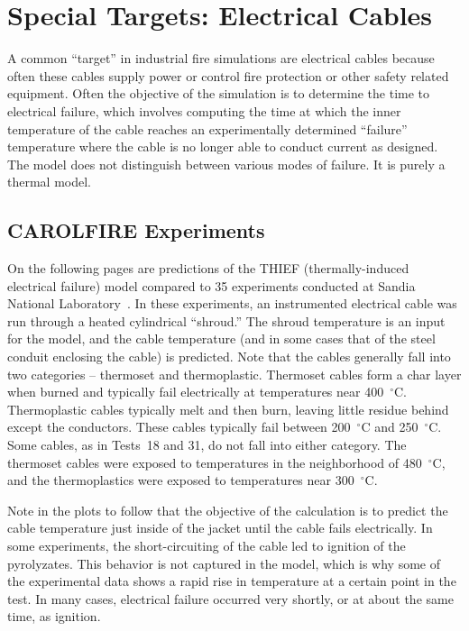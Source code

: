 \section{Special Targets: Electrical Cables}

A common ``target'' in industrial fire simulations are electrical cables because often these cables supply power or control fire protection or other safety related equipment. Often the objective of the simulation is to determine the time to electrical failure, which involves computing the time at which the inner temperature of the cable reaches an experimentally determined ``failure'' temperature where the cable is no longer able to conduct current as designed. The model does not distinguish between various modes of failure. It is purely a thermal model.


\subsection{CAROLFIRE Experiments}

On the following pages are predictions of the THIEF (thermally-induced electrical failure) model compared to 35 experiments conducted at Sandia National Laboratory~\cite{CAROLFIRE}. In these experiments, an instrumented electrical cable was run through a heated cylindrical ``shroud.'' The shroud temperature is an input for the model, and the cable temperature (and in some cases that of the steel conduit enclosing the cable) is predicted. Note that the cables generally fall into two categories -- thermoset and thermoplastic. Thermoset cables form a char layer when burned and typically fail electrically at temperatures near 400~$^\circ$C. Thermoplastic cables typically melt and then burn, leaving little residue behind except the conductors. These cables typically fail between 200~$^\circ$C and 250~$^\circ$C. Some cables, as in Tests~18 and 31, do not fall into either category. The thermoset cables were exposed to temperatures in the neighborhood of 480~$^\circ$C, and the thermoplastics were exposed to temperatures near 300~$^\circ$C.

Note in the plots to follow that the objective of the calculation is to predict the cable temperature just inside of the jacket until the cable fails electrically. In some experiments, the short-circuiting of the cable led to ignition of the pyrolyzates. This behavior is not captured in the model, which is why some of the experimental data shows a rapid rise in temperature at a certain point in the test. In many cases, electrical failure occurred very shortly, or at about the same time, as ignition.

